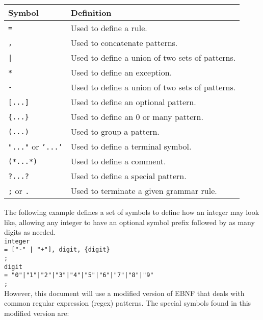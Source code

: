 \begin{center}
    \begin{tabular}{ | l | p{10cm} |}
    \hline
    \textbf{Symbol} & \textbf{Definition} \\ \hline
    \texttt{=} & Used to define a rule. \\ \hline
    \texttt{,} & Used to concatenate patterns. \\ \hline
    \texttt{|} & Used to define a union of two sets of patterns. \\ \hline
    \texttt{*} & Used to define an exception. \\ \hline
    \texttt{-} & Used to define a union of two sets of patterns. \\ \hline
    \texttt{[...]} & Used to define an optional pattern. \\ \hline
    \texttt{\{...\}} & Used to define an 0 or many pattern. \\ \hline
    \texttt{(...)} & Used to group a pattern. \\ \hline
    \texttt{"..."} or \texttt{'...'} & Used to define a terminal symbol. \\ \hline
    \texttt{(*...*)} & Used to define a comment. \\ \hline
    \texttt{?...?} & Used to define a special pattern. \\ \hline
    \texttt{;} or \texttt{.} & Used to terminate a given grammar rule. \\ \hline
    \end{tabular}
\end{center}

\noindent
The following example defines a set of symbols to define how an integer may look like, allowing any integer to have an optional symbol prefix followed by
as many digits as needed.\\

\noindent
\texttt{integer\\\tab= ["-" | "+"], digit, \{digit\}\\\tab;}\\
\texttt{digit\\\tab= "0"|"1"|"2"|"3"|"4"|"5"|"6"|"7"|"8"|"9"\\\tab;}\\

\noindent
However, this document will use a modified version of EBNF that deals with common regular expression (regex) patterns.
The special symbols found in this modified version are:

